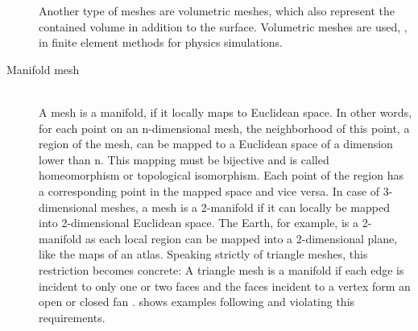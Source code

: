 \begin{description}
	Another type of meshes are volumetric meshes, which also represent the contained volume in addition to the surface.
	Volumetric meshes are used, \eg, in finite element methods for physics simulations.


	\item[Manifold mesh] \hfill \\
	A mesh is a manifold, if it locally maps to Euclidean space.
	In other words, for each point on an n-dimensional mesh, the neighborhood of this point, \ie a region of the mesh, can be mapped to a Euclidean space of a dimension lower than n.
	This mapping must be bijective and is called homeomorphism or topological isomorphism.
	Each point of the region has a corresponding point in the mapped space and vice versa.
	In case of 3-dimensional meshes, a mesh is a 2-manifold if it can locally be mapped into 2-dimensional Euclidean space.
	The Earth, for example, is a 2-manifold as each local region can be mapped into a 2-dimensional plane, like the maps of an atlas.
	Speaking strictly of triangle meshes, this restriction becomes concrete:
	A triangle mesh is a manifold if each edge is incident to only one or two faces and the faces incident to a vertex form an open or closed fan \cite{mesh_basics}.
	 shows examples following and violating this requirements.


\end{description}
